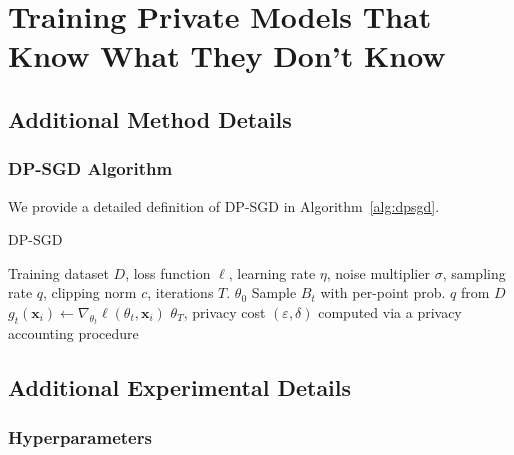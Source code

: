 \chapter{Training Private Models That Know What They Don't Know}

\section{Additional Method Details}

\subsection{DP-SGD Algorithm}

We provide a detailed definition of DP-SGD in Algorithm~\ref{alg:dpsgd}.

	\vspace{10pt}
    \begin{algorithm}[H]
	\caption{DP-SGD~\citep{abadi2016deep}}\label{alg:dpsgd}
	\begin{algorithmic}[1]
	\Require Training dataset $D$, loss function $\ell$, learning rate $\eta$, noise multiplier $\sigma$, sampling rate $q$, clipping norm $c$, iterations $T$.
		 $\theta_0$
		\State Sample $B_t$ with per-point prob. $q$ from $D$
		\State $g_t(\bm{x}_i) \gets \nabla_{\theta_t} \ell(\theta_t, \bm{x}_i)$
		\EndFor
		\label{alg:dpsgd_clipping}
		\label{alg:dpsgd_noise}
		\EndFor
		 $\theta_T$, privacy cost $(\varepsilon, \delta)$ computed via a privacy accounting procedure
	\end{algorithmic}
\end{algorithm}

\section{Additional Experimental Details}

\subsection{Hyperparameters}
\label{sec:hyp}

